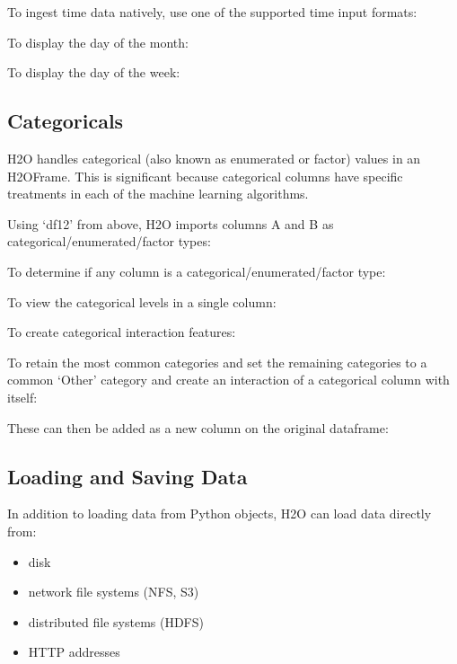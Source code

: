 {To ingest time data natively, use one of the supported time input formats:


To display the day of the month:


To display the day of the week:


\subsection{Categoricals}
H2O handles categorical (also known as enumerated or factor) values in an H2OFrame.  This is significant because categorical
columns have specific treatments in each of the machine learning algorithms.

Using `df12' from above, H2O imports columns A and B as categorical/enumerated/factor types:


To determine if any column is a categorical/enumerated/factor type:


To view the categorical levels in a single column:


To create categorical interaction features:


\newpage
To retain the most common categories and set the remaining categories to a common `Other' category
 and create an interaction of a categorical column with itself:


These can then be added as a new column on the original dataframe:


\subsection{Loading and Saving Data}
In addition to loading data from Python objects, H2O can load data directly from:
\begin{itemize}
\item disk
\item network file systems (NFS, S3)
\item distributed file systems (HDFS)
\item HTTP addresses
\end{itemize}

}

